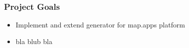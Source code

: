 \begin{frame}[t]
    \frametitle{Project Goals}
    
    \begin{itemize}
       \item Implement and extend generator for map.apps platform
       \item bla blub bla
    \end{itemize}
\end{frame}



